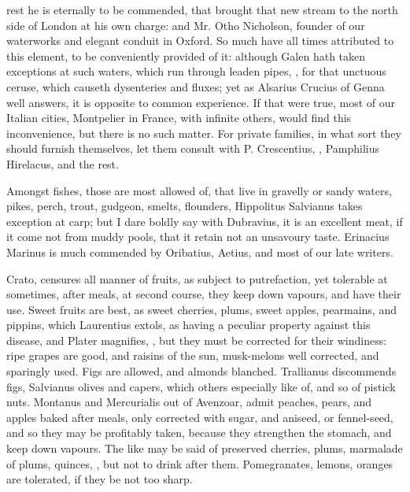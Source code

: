 {rest he is eternally to be commended, that brought that new stream to the north side of London at his own charge: and Mr. Otho Nicholson, founder of our waterworks and elegant conduit in Oxford. So much have all times attributed to this element, to be conveniently provided of it: although Galen hath taken exceptions at such waters, which run through leaden pipes, , for that unctuous ceruse, which causeth dysenteries and fluxes; yet as Alsarius Crucius of Genna well answers, it is opposite to common experience. If that were true, most of our Italian cities, Montpelier in France, with infinite others, would find this inconvenience, but there is no such matter. For private families, in what sort they should furnish themselves, let them consult with P. Crescentius, , Pamphilius Hirelacus, and the rest.

Amongst fishes, those are most allowed of, that live in gravelly or sandy waters, pikes, perch, trout, gudgeon, smelts, flounders, \etc{} Hippolitus Salvianus takes exception at carp; but I dare boldly say with Dubravius, it is an excellent meat, if it come not from muddy pools, that it retain not an unsavoury taste. Erinacius Marinus is much commended by Oribatius, Aetius, and most of our late writers.

Crato,  censures all manner of fruits, as subject to putrefaction, yet tolerable at sometimes, after meals, at second course, they keep down vapours, and have their use. Sweet fruits are best, as sweet cherries, plums, sweet apples, pearmains, and pippins, which Laurentius extols, as having a peculiar property against this disease, and Plater magnifies, , but they must be corrected for their windiness: ripe grapes are good, and raisins of the sun, musk-melons well corrected, and sparingly used. Figs are allowed, and almonds blanched. Trallianus discommends figs, Salvianus olives and capers, which others especially like of, and so of pistick nuts. Montanus and Mercurialis out of Avenzoar, admit peaches, pears, and apples baked after meals, only corrected with sugar, and aniseed, or fennel-seed, and so they may be profitably taken, because they strengthen the stomach, and keep down vapours. The like may be said of preserved cherries, plums, marmalade of plums, quinces, \etc{}, but not to drink after them. Pomegranates, lemons, oranges are tolerated, if they be not too sharp.

}
